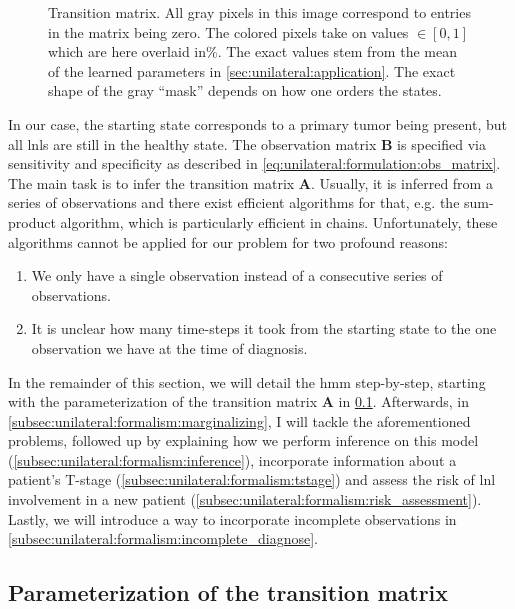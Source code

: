 \documentclass[\relativeRoot/main.tex]{subfiles}
\begin{document}
\begin{figure}
    \centering
    \def\svgwidth{0.8\textwidth}
    
    \caption[The HMM's transition matrix]{Transition matrix. All gray pixels in this image correspond to entries in the matrix being zero. The colored pixels take on values $\in [0, 1]$ which are here overlaid in\%. The exact values stem from the mean of the learned parameters in \cref{sec:unilateral:application}. The exact shape of the gray ``mask'' depends on how one orders the states.}
    \label{fig:unilateral:trans_matrix}
\end{figure}

In our case, the starting state corresponds to a primary tumor being present, but all \glspl{lnl} are still in the healthy state. The observation matrix $\mathbf{B}$ is specified via sensitivity and specificity as described in \cref{eq:unilateral:formulation:obs_matrix}. The main task is to infer the transition matrix $\mathbf{A}$. Usually, it is inferred from a series of observations and there exist efficient algorithms for that, e.g. the sum-product algorithm, which is particularly efficient in chains. Unfortunately, these algorithms cannot be applied for our problem for two profound reasons:

\begin{enumerate}
    \item We only have a single observation instead of a consecutive series of observations. 
    \item It is unclear how many time-steps it took from the starting state to the one observation we have at the time of diagnosis.
\end{enumerate}

In the remainder of this section, we will detail the \gls{hmm} step-by-step, starting with the parameterization of the transition matrix $\mathbf{A}$ in \cref{subsec:unilateral:formalism:parametrization}. Afterwards, in \cref{subsec:unilateral:formalism:marginalizing}, I will tackle the aforementioned problems, followed up by explaining how we perform inference on this model (\cref{subsec:unilateral:formalism:inference}), incorporate information about a patient's T-stage (\cref{subsec:unilateral:formalism:tstage}) and assess the risk of \gls{lnl} involvement in a new patient (\cref{subsec:unilateral:formalism:risk_assessment}). Lastly, we will introduce a way to incorporate incomplete observations in \cref{subsec:unilateral:formalism:incomplete_diagnose}.

\subsection{Parameterization of the transition matrix}
\label{subsec:unilateral:formalism:parametrization}
\end{document}
